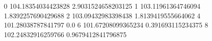 0 104.18354034423828 2.9031524658203125
1 103.11961364746094 1.8392257690429688
2 103.09432983398438 1.8139419555664062
4 101.28038787841797 0.0
6 101.67208099365234 0.391693115234375
8 102.24832916259766 0.9679412841796875
